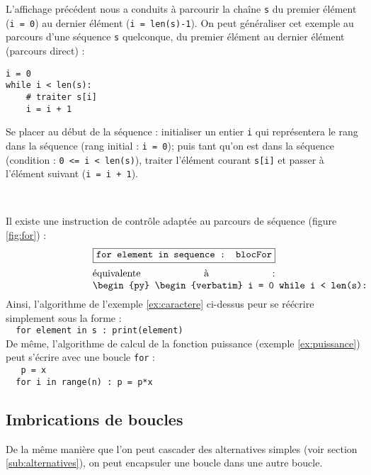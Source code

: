\noindent L'affichage précédent nous a conduits à parcourir la chaîne {\tt s}
du premier élément ({\tt i = 0}) au dernier élément ({\tt i = len(s)-1}).
On peut généraliser cet exemple au parcours d'une séquence {\tt s} quelconque, 
du premier élément au dernier élément (parcours direct) :

\begin{py}{5cm}
\begin{verbatim}
i = 0
while i < len(s):
    # traiter s[i]
    i = i + 1
\end{verbatim}
\end{py}
\hfill
\begin{py}{10cm}
Se placer au début de la séquence : initialiser un entier {\tt i} qui représentera
le rang dans la séquence (rang initial : {\tt i = 0}); puis tant qu'on est dans
la séquence (condition : {\tt 0 <= i < len(s)}), traiter l'élément courant {\tt s[i]} 
et passer à l'élément suivant ({\tt i = i + 1}).
\end{py}\\
 
\noindent Il existe une instruction de contrôle adaptée au parcours de séquence (figure \ref{fig:for}) :
$$\fbox{\tt for element in sequence : blocFor}$$
$$\begin{minipage}{6.5cm}équivalente à : 
\begin{py}{4cm}
\begin{verbatim}
i = 0
while i < len(s):
    element = sequence[i]
    blocFor
    i = i + 1
\end{verbatim}
\end{py}
\end{minipage}$$
\noindent Ainsi, l'algorithme de l'exemple \ref{ex:caractere} ci-dessus peur se réécrire 
simplement sous la forme :\\
{\tt \mbox{}\ \ for element in s : print(element)}\\
De même, l'algorithme de calcul de la fonction puissance (exemple \ref{ex:puissance})
peut s'écrire avec une boucle {\tt for} :\\
{\tt
\mbox{}\ \ p = x\\
\mbox{}\ \ for i in range(n) : p = p*x}


\subsection{Imbrications de boucles}
De la même manière que l'on peut cascader des alternatives simples
(voir section \ref{sub:alternatives}), on peut encapsuler une boucle 
dans une autre boucle.

